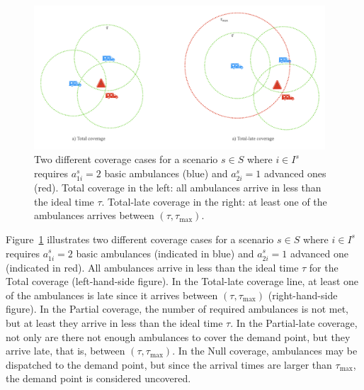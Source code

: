 \begin{figure}[H]
    \centering
    \includegraphics[width=0.97\textwidth]{figures/IntroTotalCoverage.png}
    \caption{Two different coverage cases for a scenario $s\in S$ where $i\in I^s$ requires $a_{1i}^s=2$ basic ambulances (blue) and $a_{2i}^s=1$ advanced ones (red). Total coverage in the left: all ambulances arrive in less than the ideal time $\tau$. Total-late coverage in the right: at least one of the ambulances arrives between $ (\tau,\tau_{\max})$.}
    \label{coverage-types}
\end{figure}

Figure~\ref{coverage-types} illustrates two different coverage cases for a scenario $s\in S$ where $i\in I^s$ requires $a_{1i}^s=2$ basic ambulances (indicated in blue) and $a_{2i}^s=1$ advanced one (indicated in red). All ambulances arrive in less than the ideal time $\tau$ for the Total coverage (left-hand-side figure). In the Total-late coverage line, at least one of the ambulances is late since it arrives between $ (\tau,\tau_{\max})$ (right-hand-side figure). In the Partial coverage, the number of required ambulances is not met, but at least they arrive in less than the ideal time $\tau$. In the Partial-late coverage, not only are there not enough ambulances to cover the demand point, but they arrive late, that is, between $ (\tau,\tau_{\max})$. In the Null coverage, ambulances may be dispatched to the demand point, but since the arrival times are larger than $\tau_{\max}$, the demand point is considered uncovered. 


